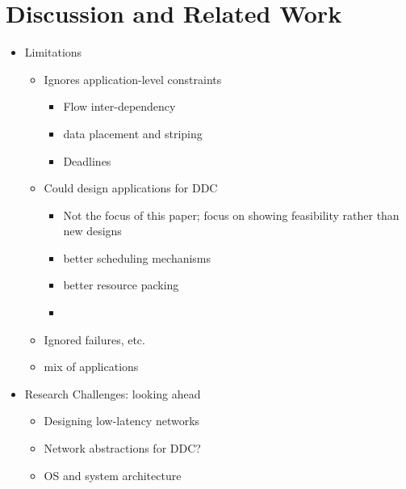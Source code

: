 \section{Discussion and Related Work}
\label{sec:discussion}
\begin{itemize}
	\item Limitations
		\begin{itemize}
			\item Ignores application-level constraints
				\begin{itemize}
					\item Flow inter-dependency
					\item data placement and striping
					\item Deadlines
				\end{itemize}				
			\item Could design applications for DDC
				\begin{itemize}
					\item Not the focus of this paper; focus on showing feasibility rather than new designs
					\item better scheduling mechanisms
					\item better resource packing
					\item 
				\end{itemize}				
			\item Ignored failures, etc.
			\item mix of applications
		\end{itemize}		
	\item Research Challenges: looking ahead
		\begin{itemize}
			\item Designing low-latency networks
			\item Network abstractions for DDC?
			\item OS and system architecture
		\end{itemize}		
\end{itemize}